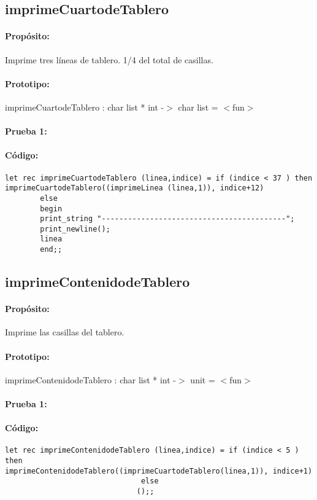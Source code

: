 \subsection{imprimeCuartodeTablero}

\paragraph{Propósito:} Imprime tres líneas de tablero. 1/4 del total de casillas.
\paragraph{Prototipo:} imprimeCuartodeTablero : char list * int -$>$ char list = $<$fun$>$
\paragraph{Prueba 1:}
\paragraph{Código:}
\begin{verbatim}
let rec imprimeCuartodeTablero (linea,indice) = if (indice < 37 ) then 
imprimeCuartodeTablero((imprimeLinea (linea,1)), indice+12)
		else 
		begin
		print_string "------------------------------------------";
		print_newline();
		linea
		end;;
\end{verbatim}

\subsection{imprimeContenidodeTablero}

\paragraph{Propósito:} Imprime las casillas del tablero. 
\paragraph{Prototipo:} imprimeContenidodeTablero : char list * int -$>$ unit = $<$fun$>$
\paragraph{Prueba 1:}
\paragraph{Código:}
\begin{verbatim}
let rec imprimeContenidodeTablero (linea,indice) = if (indice < 5 ) then 	                      
imprimeContenidodeTablero((imprimeCuartodeTablero(linea,1)), indice+1)
					           else 
						      ();;
\end{verbatim}


